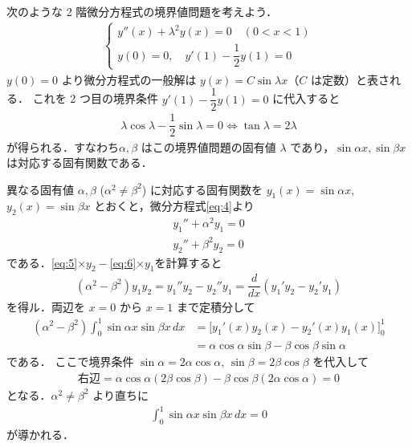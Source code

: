 \documentclass[../../main.tex]{subfiles}
\begin{document}
次のような 2 階微分方程式の境界値問題を考えよう．
\begin{align}
  \begin{cases}
    y''(x) + \lambda^2 y(x) = 0 \quad (0 < x < 1) \\[3pt]
    y(0) = 0, \quad y'(1) - \dfrac{1}{2}y(1) = 0
  \end{cases} \label{eq:4}
\end{align}
$y(0) = 0$ より微分方程式の一般解は $y(x) = C \sin\lambda x$（$C$ は定数）と表される．
これを 2 つ目の境界条件 $y'(1) - \dfrac{1}{2}y(1) = 0$ に代入すると
\begin{align}
  \lambda \cos\lambda - \dfrac{1}{2}\sin\lambda = 0 \iff \tan\lambda = 2\lambda
\end{align}
が得られる．すなわち$\alpha, \beta$ はこの境界値問題の固有値 $\lambda$ であり，$\sin\alpha x, \sin\beta x$ は対応する固有関数である．

異なる固有値 $\alpha, \beta$ ($\alpha^2 \neq \beta^2$) に対応する固有関数を $y_1(x) = \sin\alpha x$, $y_2(x) = \sin\beta x$ とおくと，微分方程式\cref{eq:4}より
\begin{align}
  y_1'' + \alpha^2 y_1 = 0 \label{eq:5} \\
  y_2'' + \beta^2 y_2 = 0 \label{eq:6}
\end{align}
である．\cref{eq:5}$\times y_2-$\cref{eq:6}$\times y_1$を計算すると
\begin{align}
  (\alpha^2 - \beta^2) y_1 y_2 = y_1'' y_2 - y_2'' y_1 = \dfrac{d}{dx} \left( y_1' y_2 - y_2' y_1 \right)
\end{align}
を得ル．両辺を $x = 0$ から $x = 1$ まで定積分して
\begin{align}
  (\alpha^2 - \beta^2) \int_0^1 \sin\alpha x \sin\beta x \, dx
  &= \Big[ y_1'(x) y_2(x) - y_2'(x) y_1(x) \Big]_0^1 \\
  &= \alpha \cos\alpha \sin\beta - \beta \cos\beta \sin\alpha
\end{align}
である．
ここで境界条件 $\sin\alpha = 2\alpha\cos\alpha, \, \sin\beta = 2\beta\cos\beta$ を代入して
\begin{align}
  \text{右辺} = \alpha \cos\alpha (2\beta\cos\beta) - \beta \cos\beta (2\alpha\cos\alpha) = 0
\end{align}
となる．$\alpha^2 \neq \beta^2$ より直ちに
\begin{align}
  \int_0^1 \sin\alpha x \sin\beta x \, dx = 0
\end{align}
が導かれる．
\end{document}
